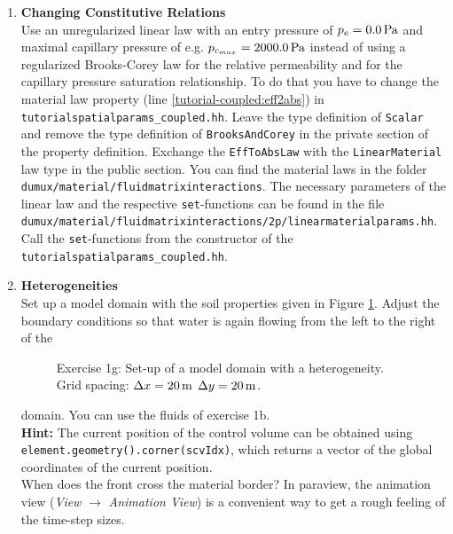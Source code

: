 \begin{enumerate}
\item \textbf{Changing Constitutive Relations} \\
  Use an unregularized linear law with an entry pressure of $p_e = \unit[0.0]{Pa}$ and maximal capillary pressure of e.g. $p_{c_{max}} = \unit[2000.0]{Pa}$ instead of using a
 regularized Brooks-Corey law for the
  relative permeability and for the capillary pressure saturation relationship. To do that you have
  to change the material law property (line \ref{tutorial-coupled:eff2abs}) in \texttt{tutorialspatialparams\_coupled.hh}. Leave the type definition of \texttt{Scalar} and remove
 the type definition of \texttt{BrooksAndCorey} in the private section of the property definition. Exchange the \texttt{EffToAbsLaw} with the \texttt{LinearMaterial} law type in the 
public section.
 You can find the material laws in the folder 
  \verb+dumux/material/fluidmatrixinteractions+. The necessary parameters
of the linear law and the respective \texttt{set}-functions can be found
 in the file \\
 \verb+dumux/material/fluidmatrixinteractions/2p/linearmaterialparams.hh+.\\
Call the \texttt{set}-functions from the constructor of the \texttt{tutorialspatialparams\_coupled.hh}.
 
\item \textbf{Heterogeneities}  \\
  Set up a model domain with the soil properties given in Figure
  \ref{tutorial-coupled:exercise1_d}. Adjust the boundary conditions
  so that water is again flowing from the left to the right of the
\begin{figure}[ht]
\centering
{} 
\caption{Exercise 1g: Set-up of a model domain with a heterogeneity. Grid spacing: $\Delta x = \unit[20]{m}$ $\Delta y = \unit[20]{m}$.}\label{tutorial-coupled:exercise1_d}
\end{figure}
domain. You can use the fluids of exercise 1b.\\
\textbf{Hint:} The current position of the control volume can be obtained using \texttt{element\allowbreak.geometry()\allowbreak.corner(scvIdx)}, which
returns a vector of the global coordinates of the current position.\\
When does the front cross the material border? In paraview, the
animation view (\textit{View} $\rightarrow$ \textit{Animation
  View}) is a convenient way to get a rough feeling of the time-step
sizes.
\end{enumerate}

